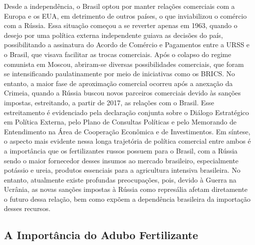 \documentclass[article,12pt,oneside,a4paper,english,brazil,sumario=tradicional]{abntex2}
\begin{document}
Desde a independência, o Brasil optou por manter relações comerciais com a Europa e os EUA, em detrimento de outros países, o que inviabilizou o comércio com a Rússia. Essa situação começou a se reverter apenas em 1963, quando o desejo por uma política externa independente guiava as decisões do país, possibilitando a assinatura do Acordo de Comércio e Pagamentos entre a URSS e o Brasil, que visava facilitar as trocas comerciais. Após o colapso do regime comunista em Moscou, abriram-se diversas possibilidades comerciais, que foram se intensificando paulatinamente por meio de iniciativas como os BRICS. No entanto, a maior fase de aproximação comercial ocorreu após a anexação da Crimeia, quando a Rússia buscou novos parceiros comerciais devido às sanções impostas, estreitando, a partir de 2017, as relações com o Brasil. Esse estreitamento é evidenciado pela declaração conjunta sobre o Diálogo Estratégico em Política Externa, pelo Plano de Consultas Políticas e pelo Memorando de Entendimento na Área de Cooperação Econômica e de Investimentos. Em síntese, o aspecto mais evidente nessa longa trajetória de política comercial entre ambos é a importância que os fertilizantes russos possuem para o Brasil, com a Rússia sendo o maior fornecedor desses insumos ao mercado brasileiro, especialmente potássio e ureia, produtos essenciais para a agricultura intensiva brasileira. No entanto, atualmente existe profundas preocupações, pois, devido à Guerra na Ucrânia, as novas sanções impostas à Rússia como represália afetam diretamente o futuro dessa relação, bem como expõem a dependência brasileira da importação desses recursos.

\subsection{A Importância do Adubo Fertilizante}
\end{document}

